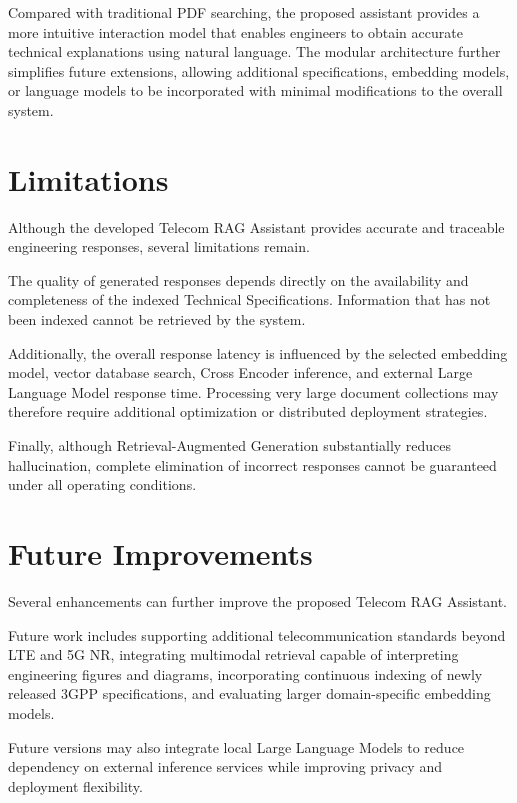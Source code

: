 Compared with traditional PDF searching, the proposed assistant provides a more intuitive interaction model that enables engineers to obtain accurate technical explanations using natural language. The modular architecture further simplifies future extensions, allowing additional specifications, embedding models, or language models to be incorporated with minimal modifications to the overall system.

\section{Limitations}

Although the developed Telecom RAG Assistant provides accurate and traceable engineering responses, several limitations remain.

The quality of generated responses depends directly on the availability and completeness of the indexed Technical Specifications. Information that has not been indexed cannot be retrieved by the system.

Additionally, the overall response latency is influenced by the selected embedding model, vector database search, Cross Encoder inference, and external Large Language Model response time. Processing very large document collections may therefore require additional optimization or distributed deployment strategies.

Finally, although Retrieval-Augmented Generation substantially reduces hallucination, complete elimination of incorrect responses cannot be guaranteed under all operating conditions.

\section{Future Improvements}

Several enhancements can further improve the proposed Telecom RAG Assistant.

Future work includes supporting additional telecommunication standards beyond LTE and 5G NR, integrating multimodal retrieval capable of interpreting engineering figures and diagrams, incorporating continuous indexing of newly released 3GPP specifications, and evaluating larger domain-specific embedding models.

Future versions may also integrate local Large Language Models to reduce dependency on external inference services while improving privacy and deployment flexibility.

